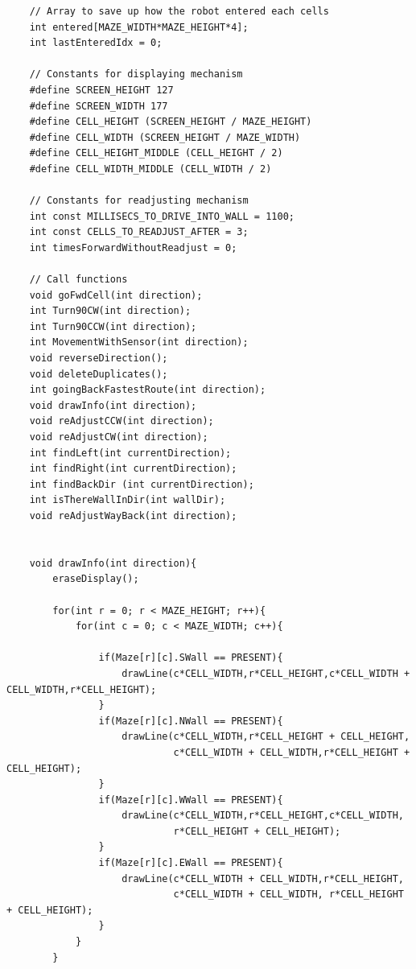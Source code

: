 \documentclass[11pt]{article}
\begin{document}
\begin{linenumbers}
\begin{verbatim}
    // Array to save up how the robot entered each cells
    int entered[MAZE_WIDTH*MAZE_HEIGHT*4];
    int lastEnteredIdx = 0;

    // Constants for displaying mechanism
    #define SCREEN_HEIGHT 127
    #define	SCREEN_WIDTH 177
    #define CELL_HEIGHT	(SCREEN_HEIGHT / MAZE_HEIGHT)
    #define CELL_WIDTH (SCREEN_HEIGHT / MAZE_WIDTH)
    #define CELL_HEIGHT_MIDDLE (CELL_HEIGHT / 2)
    #define CELL_WIDTH_MIDDLE (CELL_WIDTH / 2)

    // Constants for readjusting mechanism
    int const MILLISECS_TO_DRIVE_INTO_WALL = 1100;
    int const CELLS_TO_READJUST_AFTER = 3;
    int timesForwardWithoutReadjust = 0;

    // Call functions
    void goFwdCell(int direction);
    int Turn90CW(int direction);
    int Turn90CCW(int direction);
    int MovementWithSensor(int direction);
    void reverseDirection();
    void deleteDuplicates();
    int goingBackFastestRoute(int direction);
    void drawInfo(int direction);
    void reAdjustCCW(int direction);
    void reAdjustCW(int direction);
    int findLeft(int currentDirection);
    int findRight(int currentDirection);
    int findBackDir (int currentDirection);
    int isThereWallInDir(int wallDir);
    void reAdjustWayBack(int direction);


    void drawInfo(int direction){
        eraseDisplay();

        for(int r = 0; r < MAZE_HEIGHT; r++){
            for(int c = 0; c < MAZE_WIDTH; c++){

                if(Maze[r][c].SWall == PRESENT){
                    drawLine(c*CELL_WIDTH,r*CELL_HEIGHT,c*CELL_WIDTH + CELL_WIDTH,r*CELL_HEIGHT);
                }
                if(Maze[r][c].NWall == PRESENT){
                    drawLine(c*CELL_WIDTH,r*CELL_HEIGHT + CELL_HEIGHT,
                             c*CELL_WIDTH + CELL_WIDTH,r*CELL_HEIGHT + CELL_HEIGHT);
                }
                if(Maze[r][c].WWall == PRESENT){
                    drawLine(c*CELL_WIDTH,r*CELL_HEIGHT,c*CELL_WIDTH,
                             r*CELL_HEIGHT + CELL_HEIGHT);
                }
                if(Maze[r][c].EWall == PRESENT){
                    drawLine(c*CELL_WIDTH + CELL_WIDTH,r*CELL_HEIGHT,
                             c*CELL_WIDTH + CELL_WIDTH, r*CELL_HEIGHT + CELL_HEIGHT);
                }
            }
        }


\end{verbatim}
\end{linenumbers}
\end{document}
